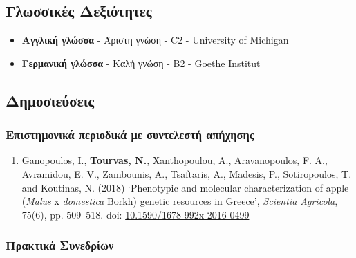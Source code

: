 \documentclass[12pt,]{scrartcl}
\begin{document}
\subsection{Γλωσσικές Δεξιότητες}\label{Γλώσσες}
\begin{itemize}
\vspace{-3mm}
%
\setlength\itemsep{-0.6em}
\item \textbf{Αγγλική γλώσσα} - Άριστη γνώση - C2 - University of Michigan

\item \textbf{Γερμανική γλώσσα} - Καλή γνώση - Β2 - Goethe Institut
\end{itemize}



\subsection{Δημοσιεύσεις}\label{publications}

\subsubsection{Επιστημονικά περιοδικά με συντελεστή απήχησης}\label{journals}
\vspace{-3mm}
\begin{enumerate}

\leftskip-0.07in

\item Ganopoulos, I., \textbf{Tourvas, N.}, Xanthopoulou, A., Aravanopoulos, F. A., Avramidou, E. V., Zambounis, A., Tsaftaris, A., Madesis, P., Sotiropoulos, T. and Koutinas, N. (2018) ‘Phenotypic and molecular characterization of apple (\textit{Malus} x \textit{domestica} Borkh) genetic resources in Greece’, \textit{Scientia Agricola}, 75(6), pp. 509–518. doi: \href{http://dx.doi.org/10.1590/1678-992x-2016-0499}{10.1590/1678-992x-2016-0499}


\end{enumerate}


\subsubsection{Πρακτικά Συνεδρίων}\label{conferences}
\end{document}
